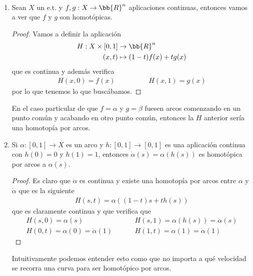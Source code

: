 \begin{ejemplo}\
    \begin{enumerate}
        \item Sean $X$ un e.t. y $f,g:X \to \bb{R}^n$ aplicaciones continuas, entonces vamos a ver que $f$ y $g$ son homotópicas.
        \begin{proof}
            Vamos a definir la aplicación
            \begin{align*}
                H:X\times [0,1]&\to \bb{R}^n\\
                (x,t) & \mapsto (1-t)f(x) + tg(x)
            \end{align*} 
            que es continua y además verifica
            \begin{gather*}
                H(x,0) = f(x) \hspace{2cm} H(x,1) = g(x)
            \end{gather*}
            por lo que tenemos lo que buscábamos.
        \end{proof}
        En el caso particular de que $f=\alpha$ y $g=\beta$ fuesen arcos comenzando en un punto común y acabando en otro punto común, entonces la $H$ anterior sería una homotopía por arcos.

        \item Si $\alpha: [0,1]\to X$ es un arco y $h:[0,1] \to [0,1]$ es una aplicación continua con $h(0)=0$ y $h(1)=1$, entonces $\dot{\alpha}(s) = \alpha(h(s))$ es homotópica por arcos a $\alpha(s)$.
        
        \begin{proof}
            Es claro que $\dot{\alpha}$ es continua y existe una homotopía por arcos entre $\alpha$ y $\dot{\alpha}$ que es la siguiente
            \begin{gather*}
                H(s,t) = \alpha((1-t)s + th(s))
            \end{gather*}
            que es claramente continua y que verifica que 
            \begin{align*}
                H(s,0) = \alpha(s) \hspace{1cm} & H(s,1) = \alpha(h(s)) = \dot{\alpha}(s)\\
                H(0,t) = \alpha(0)=\dot{\alpha}(1) \hspace{1cm} & H(1,t) = \alpha(1) = \dot{\alpha}(1)
            \end{align*}
        \end{proof}
        Intuitivamente podemos entender esto como que no importa a qué velocidad se recorra una curva para ser homotópico por arcos.
    \end{enumerate} 
\end{ejemplo}

